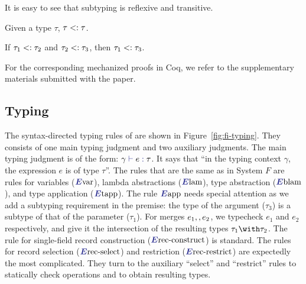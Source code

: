 
It is easy to see that subtyping is reflexive and transitive.

\begin{lemma} \label{sub-refl}
Given a type $ \tau $, $ \tau <: \tau $.
\end{lemma}

\begin{lemma} \label{sub-trans}
If $ \tau_1 <: \tau_2 $ and $ \tau_2 <: \tau_3 $,
then $ \tau_1 <: \tau_3 $.
\end{lemma}

For the corresponding mechanized proofs in Coq, we refer to the supplementary
materials submitted with the paper. 

\subsection{Typing}

\begin{figure*}
  \small
  
  \caption{The type system of \name.}
  \label{fig:fi-typing}
\end{figure*}

The syntax-directed typing rules of \name are shown in Figure~\ref{fig:fi-typing}. They consists of one
main typing judgment and two auxiliary judgments. The main typing judgment is of
the form: $ \judgee \gamma e \tau $. It says that ``in the typing context
$\gamma$, the expression $e$ is of type $\tau$''. The rules that are the same as
in System $F$ are rules for variables ($\rulelabelevar$), lambda abstractions
($\rulelabelelam$), type abstraction ($\rulelabeleblam$), and type application
($\rulelabeletapp$). The rule $\rulelabeleapp$ needs special attention as we add
a subtyping requirement in the premise: the type of the argument ($\tau_3$) is a
subtype of that of the parameter ($\tau_1$). 
For merges
$e_1 ,, e_2$, we typecheck $e_1$ and $e_2$ respectively, and give it the
intersection of the resulting types $\tau_1 \andop \tau_2$. The rule for
single-field record construction ($\rulelabelerecconstruct$) is standard. The rules
for record selection ($\rulelabelerecselect$) and restriction
($\rulelabelerecrestrict$) are expectedly the most complicated. They turn to the
auxiliary ``select'' and ``restrict'' rules to statically check operations and
to obtain resulting types.

